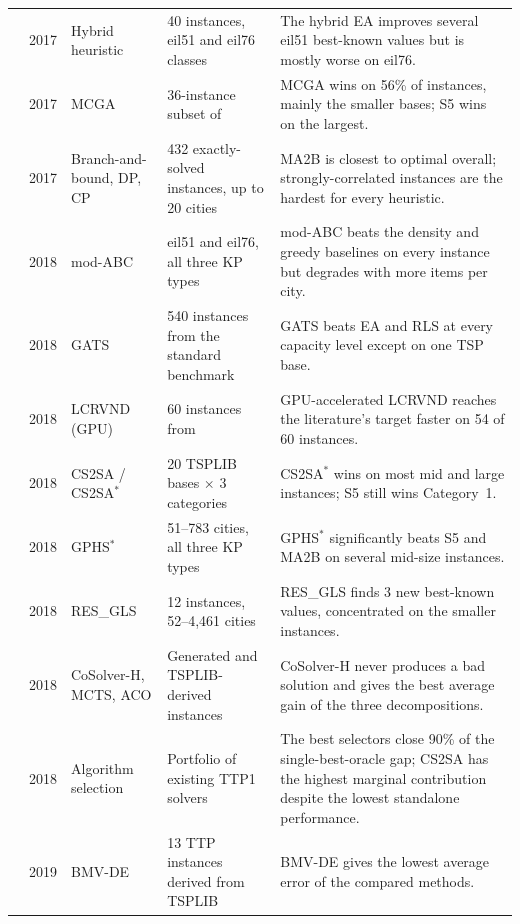{\begin{longtable}{@{}p{2.8cm}cp{3.0cm}p{4.9cm}p{7.9cm}@{}}
\citet{moeini2017hybrid} & 2017 & Hybrid heuristic & 40 instances, eil51 and eil76 classes & The hybrid EA improves several eil51 best-known values but is mostly worse on eil76. \\
\citet{vieira2017genetic} & 2017 & MCGA & 36-instance subset of \citet{faulkner2015approximate} & MCGA wins on 56\% of instances, mainly the smaller bases; S5 wins on the largest. \\
\citet{wu2017exact} & 2017 & Branch-and-bound, DP, CP & 432 exactly-solved instances, up to 20 cities & MA2B is closest to optimal overall; strongly-correlated instances are the hardest for every heuristic. \\
\citet{alharbi2018design} & 2018 & mod-ABC & eil51 and eil76, all three KP types & mod-ABC beats the density and greedy baselines on every instance but degrades with more items per city. \\
\citet{alharbi2018hybrid} & 2018 & GATS & 540 instances from the standard benchmark & GATS beats EA and RLS at every capacity level except on one TSP base. \\
\citet{araujo2018novel} & 2018 & LCRVND (GPU) & 60 instances from \citet{bonyadi2013travelling} & GPU-accelerated LCRVND reaches the literature's target faster on 54 of 60 instances. \\
\citet{el2018efficiently} & 2018 & CS2SA / CS2SA$^\ast$ & 20 TSPLIB bases $\times$ 3 categories & CS2SA$^\ast$ wins on most mid and large instances; S5 still wins Category~1. \\
\citet{el2018hyperheuristic} & 2018 & GPHS$^\ast$ & 51--783 cities, all three KP types & GPHS$^\ast$ significantly beats S5 and MA2B on several mid-size instances. \\
\citet{nieto2018guided} & 2018 & RES\_GLS & 12 instances, 52--4{,}461 cities & RES\_GLS finds 3 new best-known values, concentrated on the smaller instances. \\
\citet{przybylek2018decomposition} & 2018 & CoSolver-H, MCTS, ACO & Generated and TSPLIB-derived instances & CoSolver-H never produces a bad solution and gives the best average gain of the three decompositions. \\
\citet{wagner2018case} & 2018 & Algorithm selection & Portfolio of existing TTP1 solvers & The best selectors close 90\% of the single-best-oracle gap; CS2SA has the highest marginal contribution despite the lowest standalone performance. \\
\citet{ali2019novel} & 2019 & BMV-DE & 13 TTP instances derived from TSPLIB & BMV-DE gives the lowest average error of the compared methods. \\

\end{longtable}}
